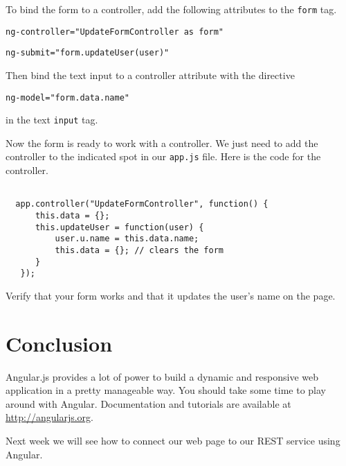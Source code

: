 \documentclass{article}
\begin{document}
To bind the form to a controller, add the following attributes to the \texttt{form} tag.

\texttt{ng-controller="UpdateFormController as form"}

\texttt{ng-submit="form.updateUser(user)"}

Then bind the text input to a controller attribute with the directive

\texttt{ng-model="form.data.name"}

in the text \texttt{input} tag.

Now the form is ready to work with a controller.  We just need to add the controller to the indicated spot in our \texttt{app.js} file.  Here is the code for the controller.

\begin{verbatim}

  app.controller("UpdateFormController", function() {
      this.data = {};
      this.updateUser = function(user) {
          user.u.name = this.data.name;
          this.data = {}; // clears the form
      }
   });
\end{verbatim}

Verify that your form works and that it updates the user's name on the page.

\section{Conclusion}
Angular.js provides a lot of power to build a dynamic and responsive web application in a pretty manageable way.  You should take some time to play around with Angular.  Documentation and tutorials are available at \url{http://angularjs.org}.

Next week we will see how to connect our web page to our REST service using Angular.
\end{document}
